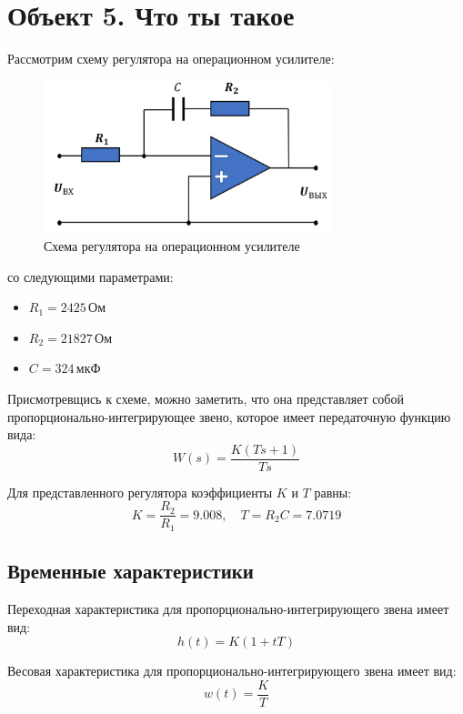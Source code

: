 \chapter{Объект 5. Что ты такое}

Рассмотрим схему регулятора на операционном усилителе:

\begin{figure}[H]
    \centering
    \includegraphics[width=0.75\textwidth, trim={0cm 0cm 0cm 0cm}]{../images/scheme.png}
    \caption{Схема регулятора на операционном усилителе}
\end{figure}

со следующими параметрами:
\begin{itemize}
    \item[] \( R_1 = 2425\, \text{Ом} \)
    \item[] \( R_2 = 21827\, \text{Ом} \)
    \item[] \( C = 324\, \text{мкФ} \)
\end{itemize}

Присмотревщись к схеме, можно заметить, что она 
представляет собой пропорционально-интегрирующее звено, которое
имеет передаточную функцию вида:
\[
    W(s) = \frac{K(Ts + 1)}{Ts}
\]

Для представленного регулятора коэффициенты \( K \) и \( T \) равны:
\[
    K = \frac{R_2}{R_1} = 9.008, \quad T = R_2 C = 7.0719
\]

\section{Временные характеристики}

Переходная характеристика для пропорционально-интегрирующего звена имеет вид:
\[
    h(t) = K \left( 1 + {t}{T} \right)
\]

Весовая характеристика для пропорционально-интегрирующего звена имеет вид:
\[
    w(t) = \frac{K}{T}
\]

